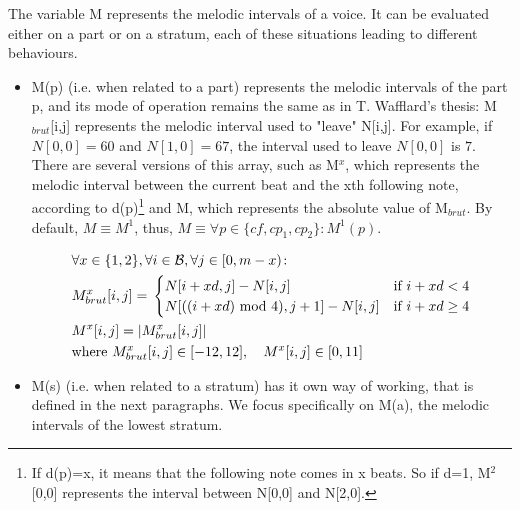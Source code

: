 The variable M represents the melodic intervals of a voice. It can be evaluated either on a part or on a stratum, each of these situations leading to different behaviours.
\begin{itemize}
    \item 

M(p) (i.e. when related to a part) represents the melodic intervals of the part p, and its mode of operation remains the same as in T. Wafflard's thesis: M$_{brut}$[i,j] represents the melodic interval used to "leave" N[i,j]. For example, if $N[0,0]=60$ and $N[1,0]=67$, the interval used to leave $N[0,0]$ is $7$. There are several versions of this array, such as M$^x$, which represents the melodic interval between the current beat and the xth following note, according to d(p)\footnote{If d(p)=x, it means that the following note comes in x beats. So if d=1, M$^2$[0,0] represents the interval between N[0,0] and N[2,0].} and M, which represents the absolute value of M$_{brut}$. By default, $M\equiv M^1$, thus, $M\equiv \forall p \in \{\mathit{cf}, cp_1, cp_2\} \colon M^1(p)$.

\begin{equation}
    \begin{aligned}
        &\forall x \in \{1, 2\}, \forall i \in \mathcal{B}, \forall j \in [0, m-x) \colon \\
        &M^x_{brut}[i, j] = \,  
        \begin{cases}
            N[i+xd, j] - N[i, j] & \text{if } i+xd < 4\\
            N[((i+xd) \text{ mod } 4), j+1] - N[i, j] & \text{if } i+xd \geq 4\\
        \end{cases}\\
        &M^x[i, j] = \left|M^x_{brut}[i, j]\right|\\
        &\text{where } M^x_{brut}[i, j] \in [-12, 12], \quad M^x[i, j] \in [0, 11] 
    \end{aligned}
\end{equation}


\item M(s) (i.e. when related to a stratum) has it own way of working, that is defined in the next paragraphs. We focus specifically on M(a), the melodic intervals of the lowest stratum.
\end{itemize}

